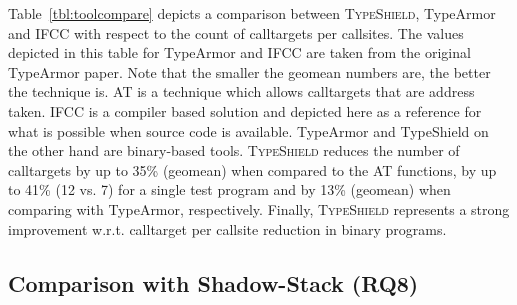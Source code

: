 Table~\ref{tbl:toolcompare} depicts 
a comparison between \textsc{TypeShield}, TypeArmor and IFCC with respect to the count of calltargets per callsites. 
The values depicted in this table for TypeArmor and IFCC are taken from the original TypeArmor paper.
Note that the smaller the geomean numbers are, the better the technique is. AT is a technique which allows calltargets that are address taken. 
IFCC is a compiler based solution and depicted here as a reference for what is possible when 
source code is available. TypeArmor and TypeShield on the other hand are binary-based tools. 
\textsc{TypeShield} reduces the number of calltargets by up to 35\% (geomean) when 
compared to the AT functions, by up to 41\% (12 vs. 7) for a single test program and by 13\% (geomean) 
when comparing with TypeArmor, respectively.
Finally, \textsc{TypeShield} represents a strong improvement w.r.t. calltarget per callsite reduction in binary programs.

\subsection{Comparison with Shadow-Stack (RQ8)}
\label{RQ10: Comparison with SafeStack}

